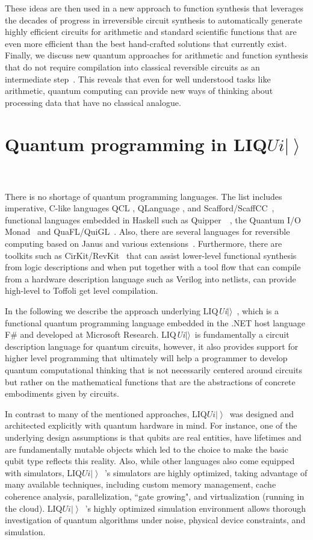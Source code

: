 \documentclass[conference]{IEEEtran}
\newcommand{\ket}[1]{\left| #1\right\rangle}        %
\newcommand{\Liquid}{LIQ$Ui\ket{}$\ }
\newcommand{\LIQUID}{{LIQ{\em Ui}$|\rangle$}}
\begin{document}
These ideas are then used in a new approach to function synthesis that leverages the decades of progress in irreversible circuit synthesis to automatically generate highly efficient circuits for arithmetic and standard scientific functions that are even more efficient than the best hand-crafted solutions that currently exist.  Finally, we discuss new quantum approaches for arithmetic and function synthesis that do not require compilation into classical reversible circuits as an intermediate step~\cite{WR16}.  This reveals that even for well understood tasks like arithmetic, quantum computing can provide new ways of thinking about processing data that have no classical analogue. 

\section{Quantum programming in \Liquid} %

There is no shortage of quantum programming languages. The list includes imperative, C-like languages QCL \cite{Oemer:2005}, QLanguage \cite{BCS:2003}, and Scafford/ScaffCC~\cite{HPJ+:2015,KPK+:2015}, functional languages embedded in Haskell such as Quipper~~\cite{GLR+:2013a,GLR+:2013b}, the Quantum I/O Monad~\cite{AG:2009} and QuaFL/QuiGL~\cite{LST+:2013,LR:2013}. Also, there are several languages for reversible computing based on Janus and various extensions~\cite{YG:2007,Thomsen:2012,Perumalla:2014}. 
Furthermore, there are toolkits such as CirKit/RevKit~\cite{SFWD12} that can assist lower-level functional synthesis from logic descriptions and when put together with a tool flow that can compile from a hardware description language such as Verilog into netlists, can provide high-level to Toffoli get level compilation. 

In the following we describe the approach underlying \LIQUID~\cite{WS:2014}, which is a functional quantum programming language embedded in the .NET host language F\# and developed at Microsoft Research. \LIQUID~is fundamentally a circuit description language for quantum circuits, however, it also provides support for higher level programming that ultimately will help a programmer to develop quantum computational thinking that is not necessarily centered around circuits but rather on the mathematical functions that are the abstractions of concrete embodiments given by circuits. 

In contrast to many of the mentioned approaches, \Liquid was designed and architected explicitly with quantum hardware in mind. 
For instance, one of the underlying design assumptions is that qubits are real entities, have lifetimes and are fundamentally mutable objects which led to the choice to make the basic qubit type reflects this reality.
Also, while other languages also come equipped with simulators, \Liquid's simulators are highly optimized, taking advantage of many available techniques, including custom memory management, cache coherence analysis, parallelization, ``gate growing", and virtualization (running in the cloud). \Liquid's highly optimized simulation environment allows thorough investigation of quantum algorithms under noise, physical device constraints, and simulation.
\end{document}
